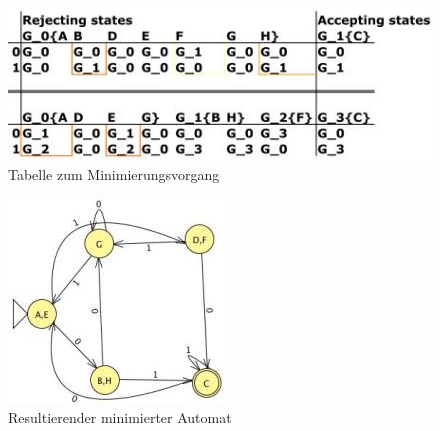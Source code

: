 \begin{figure}[h]
 \centering
 \includegraphics[keepaspectratio, scale=0.75]{objectsToInclude/Moore_Tab.jpg}
 \caption{Tabelle zum Minimierungsvorgang}
\label{fig:FSA_Moore_Tab}
\end{figure}

\begin{figure}[h]
 \centering
 \includegraphics[keepaspectratio, scale=0.75]{objectsToInclude/Moore_minimal.jpg}
 \caption{Resultierender minimierter Automat}
\label{fig:FSA_Moore_minimal}
\end{figure}
